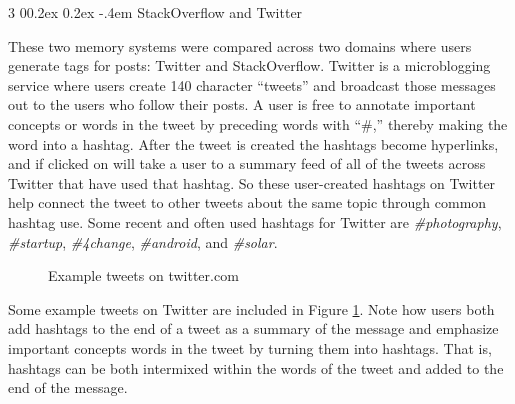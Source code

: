 \documentclass[man,floatsintext,donotrepeattitle]{apa6}
\makeatletter
\renewcommand{\subsubsection}{%
  \@startsection
  {subsubsection}%
  {3}%
  {\parindent}%
  {0\baselineskip \@plus 0.2ex \@minus 0.2ex}%
  {-.4em}%
  {\normalfont\normalsize\bfseries\addperi}}
\makeatother
\begin{document}
\subsubsection{StackOverflow and Twitter}

These two memory systems were compared across two domains where users generate tags for posts: Twitter and StackOverflow.
Twitter is a microblogging service where users create 140 character ``tweets'' and broadcast those messages out to the users who follow their posts.
A user is free to annotate important concepts or words in the tweet by preceding words with ``\#,'' thereby making the word into a hashtag.
After the tweet is created the hashtags become hyperlinks, and if clicked on will take a user to a summary feed of all of the tweets across Twitter that have used that hashtag.
So these user-created hashtags on Twitter help connect the tweet to other tweets about the same topic through common hashtag use.
Some recent and often used hashtags for Twitter are \emph{\#photography}, \emph{\#startup}, \emph{\#4change}, \emph{\#android}, and \emph{\#solar}.

\begin{figure}[!htbp]
  {%
    \setlength{\fboxsep}{0pt}%
    \setlength{\fboxrule}{1pt}%
    \hfill
    \hfill
    \hfill
    \vfill
    \hfill
    \hfill
    \hfill
    \caption{Example tweets on twitter.com}
    \label{figTweetExample}
  }%
\end{figure}

Some example tweets on Twitter are included in Figure \ref{figTweetExample}.
Note how users both add hashtags to the end of a tweet as a summary of the message and emphasize important concepts words in the tweet by turning them into hashtags.
That is, hashtags can be both intermixed within the words of the tweet and added to the end of the message.
\end{document}
